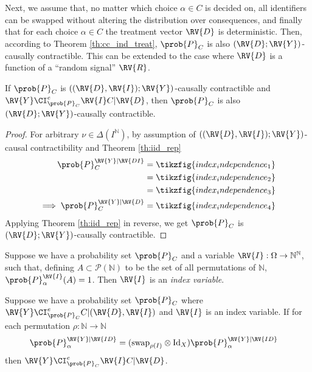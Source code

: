 Next, we assume that, no matter which choice $\alpha\in C$ is decided on, all identifiers can be swapped without altering the distribution over consequences, and finally that for each choice $\alpha\in C$ the treatment vector $\RV{D}$ is deterministic. Then, according to Theorem \ref{th:cc_ind_treat}, $\prob{P}_C$ is also $(\RV{D};\RV{Y})$-causally contractible. This can be extended to the case where $\RV{D}$ is a function of a ``random signal'' $\RV{R}$.

\begin{lemma}\label{lem:ind_to_cc}
If $\prob{P}_C$ is $((\RV{D},\RV{I});\RV{Y})$-causally contractible and $\RV{Y}\CI_{\prob{P}_C}^e \RV{I}C|\RV{D}$, then $\prob{P}_C$ is also $(\RV{D};\RV{Y})$-causally contractible.
\end{lemma}

\begin{proof}
For arbitrary $\nu\in \Delta(I^{\mathbb{N}})$, by assumption of $((\RV{D},\RV{I});\RV{Y})$-causal contractibility and Theorem \ref{th:iid_rep}
\begin{align}
    \prob{P}_C^{\RV{Y}|\RV{DI}} &= \tikzfig{index_independence_1}\\
    &= \tikzfig{index_independence_2}\\
    &= \tikzfig{index_independence_3}\\
    \implies \prob{P}_C^{\RV{Y}|\RV{D}} &= \tikzfig{index_independence_4}
\end{align}
Applying Theorem \ref{th:iid_rep} in reverse, we get $\prob{P}_C$ is $(\RV{D};\RV{Y})$-causally contractible.
\end{proof}

\begin{definition}
Suppose we have a probability set $\prob{P}_C$ and a variable $\RV{I}:\Omega\to \mathbb{N}^{\mathbb{N}}$, such that, defining $A\subset\mathscr{P}(\mathbb{N})$ to be the set of all permutations of $\mathbb{N}$, $\prob{P}_\alpha^{\RV{I}}(A)=1$. Then $\RV{I}$ is an \emph{index variable}.
\end{definition}

\begin{lemma}\label{lem:ind}
Suppose we have a probability set $\prob{P}_C$ where $\RV{Y}\CI_{\prob{P}_C}^e C|(\RV{D},\RV{I})$ and $\RV{I}$ is an index variable. If for each permutation $\rho:\mathbb{N}\to \mathbb{N}$
\begin{align}
    \prob{P}_\alpha^{\RV{Y}|\RV{ID}} &= (\text{swap}_{\rho(I)}\otimes \text{Id}_X )\prob{P}_\alpha^{\RV{Y}|\RV{ID}}
\end{align}
then $\RV{Y}\CI_{\prob{P}_C}^e \RV{I}C|\RV{D}$.
\end{lemma}

